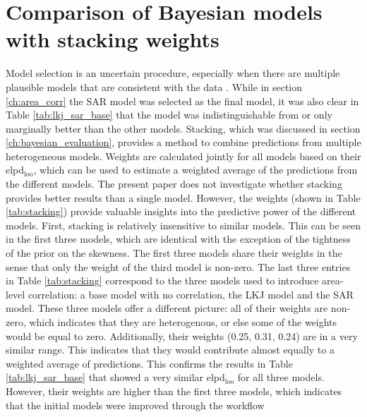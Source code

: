 \section{Comparison of Bayesian models with stacking weights}

Model selection is an uncertain procedure, especially when there are multiple plausible models that are consistent with the data \citep{gelman_bayesian_2020}.
While in section \ref{ch:area_corr} the SAR model was selected as the final model, it was also clear in Table \ref{tab:lkj_sar_base} that the model was indistinguishable from or only marginally better than the other models.
Stacking, which was discussed in section \ref{ch:bayesian_evaluation}, provides a method to combine predictions from multiple heterogeneous models.
Weights are calculated jointly for all models based on their elpd$_{\text{loo}}$, which can be used to estimate
a weighted average of the predictions from the different models.
The present paper does not investigate whether stacking provides better results than a single model.
However, the weights (shown in Table \ref{tab:stacking}) provide valuable insights into the predictive power of the different models.
First, stacking is relatively insensitive to similar models.
This can be seen in the first three models, which are identical with the exception of the tightness of the prior on the skewness.
The first three models share their weights in the sense that only the weight of the third model is non-zero.
The last three entries in Table \ref{tab:stacking} correspond to the three models used to introduce area-level correlation: a base model with no correlation, the LKJ model and the SAR model.
These three models offer a different picture: all of their weights are non-zero, which indicates that they are heterogenous, or else some of the weights would be equal to zero.
Additionally, their weights (0.25, 0.31, 0.24) are in a very similar range.
This indicates that they would contribute almost equally to a weighted average of predictions.
This confirms the results in Table \ref{tab:lkj_sar_base} that showed a very similar elpd$_{\text{loo}}$ for all three models.
However, their weights are higher than the first three models, which indicates that the initial models were improved through the workflow

